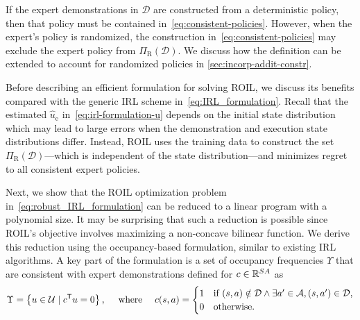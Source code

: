 \documentclass[10pt]{article}
\theoremstyle{plain}
\theoremstyle{remark}
\begin{document}
If the expert demonstrations in $\mathcal{D}$ are constructed from a deterministic policy, then that policy must be contained in~\eqref{eq:consistent-policies}. However, when the expert's policy is randomized, the construction in~\eqref{eq:consistent-policies} may exclude the expert policy from $\Pi_{\mathrm{R}}(\mathcal{D})$. We discuss how the definition can be extended to account for randomized policies in \cref{sec:incorp-addit-constr}. 

Before describing an efficient formulation for solving ROIL, we discuss its benefits compared with the generic IRL scheme in~\eqref{eq:IRL_formulation}. Recall that the estimated $\hat{u}_{\mathrm{e}}$ in~\eqref{eq:irl-formulation-u} depends on the initial state distribution which may lead to large errors when the demonstration and execution state distributions differ. Instead, ROIL uses the training data to construct the set $\Pi_{\mathrm{R}}(\mathcal{D})$---which is independent of the state distribution---and minimizes regret to all consistent expert policies. 

Next, we show that the ROIL optimization problem in~\eqref{eq:robust_IRL_formulation} can be reduced to a linear program with a polynomial size. It may be surprising that such a reduction is possible since ROIL's objective involves maximizing a non-concave bilinear function. We derive this reduction using the occupancy-based formulation, similar to existing IRL algorithms. A key part of the formulation is a set of occupancy frequencies $\Upsilon$ that are consistent with expert demonstrations defined for $c\in \mathbb{R}^{SA}$ as 
%
\begin{equation}\label{eq:consistent-occupancies}
  \Upsilon = \left\{ u \in \mathcal{U} \mid c^{\mathsf{T}} u = 0  \right\},
  \quad
  \text{ where }
  \quad
  c(s,a) =
  \begin{cases}
    1 &\text{if  }
        (s,a) \notin \mathcal{D} \wedge
        \exists a'\in \mathcal{A}, (s, a') \in \mathcal{D}, \\
    0 & \text{otherwise}.
  \end{cases}
\end{equation}


\end{document}
